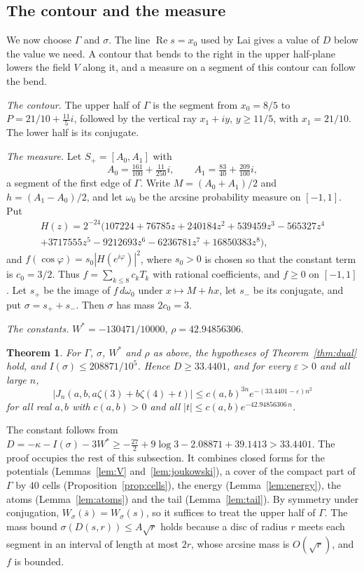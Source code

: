 \documentclass[11pt]{amsart}
\newtheorem{theorem}{Theorem}[section]
\theoremstyle{definition}
\theoremstyle{remark}
\numberwithin{equation}{section}
\begin{document}
\subsection{The contour and the measure}
We now choose $\Gamma$ and $\sigma$. The line $\operatorname{Re}s=x_0$ used by Lai gives a value of $D$ below the value
we need. A contour that bends to the right in the upper half-plane lowers the field $V$ along it, and a measure on a
segment of this contour can follow the bend.

\emph{The contour.} The upper half of $\Gamma$ is the segment from $x_0=8/5$ to $P=21/10+\frac{11}5i$, followed by the
vertical ray $x_1+iy$, $y\ge11/5$, with $x_1=21/10$. The lower half is its conjugate.

\emph{The measure.} Let $S_+=[A_0,A_1]$ with
\[
 A_0=\tfrac{161}{100}+\tfrac{11}{250}i,\qquad A_1=\tfrac{83}{40}+\tfrac{209}{100}i,
\]
a segment of the first edge of $\Gamma$. Write $M=(A_0+A_1)/2$ and $h=(A_1-A_0)/2$, and let $\omega_0$ be the arcsine
probability measure on $[-1,1]$. Put
\begin{multline*}
 H(z)=2^{-24}\bigl(107224+76785z+240184z^2+539459z^3-565327z^4\\
 +3717555z^5-9212693z^6-6236781z^7+16850383z^8\bigr),
\end{multline*}
and $f(\cos\varphi)=s_0|H(e^{i\varphi})|^2$, where $s_0>0$ is chosen so that the constant term is $c_0=3/2$. Thus
$f=\sum_{k\le8}c_kT_k$ with rational coefficients, and $f\ge0$ on $[-1,1]$. Let $s_+$ be the image of $f\,d\omega_0$
under $x\mapsto M+hx$, let $s_-$ be its conjugate, and put $\sigma=s_++s_-$. Then $\sigma$ has mass $2c_0=3$.

\emph{The constants.} $W^*=-130471/10000$, $\rho=42.94856306$.

\begin{theorem}\label{thm:decay}
For $\Gamma$, $\sigma$, $W^*$ and $\rho$ as above, the hypotheses of Theorem~\ref{thm:dual} hold, and
$I(\sigma)\le208871/10^5$. Hence $D\ge33.4401$, and for every $\varepsilon>0$ and all large $n$,
\[
 |J_n(a,b,a\zeta(3)+b\zeta(4)+t)|\le c(a,b)^{3n}e^{-(33.4401-\varepsilon)n^2}
\]
for all real $a,b$ with $c(a,b)>0$ and all $|t|\le c(a,b)e^{-42.94856306\,n}$.
\end{theorem}

The constant follows from $D=-\kappa-I(\sigma)-3W^*\ge-\tfrac{27}2+9\log3-2.08871+39.1413>33.4401$. The proof
occupies the rest of this subsection. It combines closed forms for the potentials (Lemmas~\ref{lem:V}
and~\ref{lem:joukowski}), a cover of the compact part of $\Gamma$ by $40$ cells (Proposition~\ref{prop:cells}), the energy
(Lemma~\ref{lem:energy}), the atoms (Lemma~\ref{lem:atoms}) and the tail (Lemma~\ref{lem:tail}). By symmetry under
conjugation, $W_\sigma(\bar s)=W_\sigma(s)$, so it suffices to treat the upper half of $\Gamma$. The mass bound
$\sigma(D(s,r))\le A\sqrt r$ holds because a disc of radius $r$ meets each segment in an interval of length at most $2r$,
whose arcsine mass is $O(\sqrt r)$, and $f$ is bounded.
\end{document}
